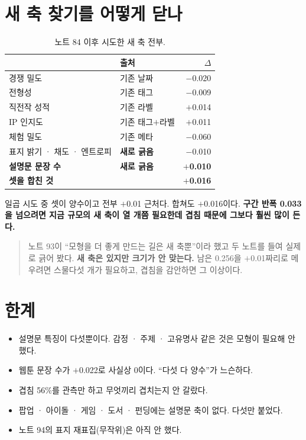\documentclass[10pt]{article}
\begin{document}

\section{새 축 찾기를 어떻게 닫나}

\begin{table}[t]
\centering\tsize
\caption{노트 84 이후 시도한 새 축 전부.}
\begin{tabular}{llr}
\toprule
& 출처 & $\Delta$ \\
\midrule
경쟁 밀도 & 기존 날짜 & $-$0.020 \\
전형성 & 기존 태그 & $-$0.009 \\
직전작 성적 & 기존 라벨 & $+$0.014 \\
IP 인지도 & 기존 태그$+$라벨 & $+$0.011 \\
체험 밀도 & 기존 메타 & $-$0.060 \\
표지 밝기 · 채도 · 엔트로피 & \textbf{새로 긁음} & $-$0.010 \\
\textbf{설명문 문장 수} & \textbf{새로 긁음} & \textbf{$+$0.010} \\
\midrule
\textbf{셋을 합친 것} & & \textbf{$+$0.016} \\
\bottomrule
\end{tabular}
\end{table}

일곱 시도 중 셋이 양수이고 전부 $+$0.01 근처다. 합쳐도 $+$0.016이다.
\textbf{구간 반폭 0.033을 넘으려면 지금 규모의 새 축이 열 개쯤 필요한데
겹침 때문에 그보다 훨씬 많이 든다.}

\begin{quote}\fontsize{9.5}{11.5}\selectfont
노트 93이 ``모형을 더 좋게 만드는 길은 새 축뿐''이라 했고 두 노트를 들여
실제로 긁어 봤다. \textbf{새 축은 있지만 크기가 안 맞는다.} 남은 0.256을
$+$0.01짜리로 메우려면 스물다섯 개가 필요하고, 겹침을 감안하면 그 이상이다.
\end{quote}

\section{한계}

\begin{itemize}[leftmargin=1.1em,itemsep=0.15em]
\item 설명문 특징이 다섯뿐이다. 감정 · 주제 · 고유명사 같은 것은 모형이 필요해
      안 했다.
\item 웹툰 문장 수가 $+$0.022로 사실상 0이다. ``다섯 다 양수''가 느슨하다.
\item 겹침 56\%를 관측만 하고 무엇끼리 겹치는지 안 갈랐다.
\item 팝업 · 아이돌 · 게임 · 도서 · 펀딩에는 설명문 축이 없다. 다섯만 붙었다.
\item 노트 94의 표지 재표집(무작위)은 아직 안 했다.
\end{itemize}
\end{document}

